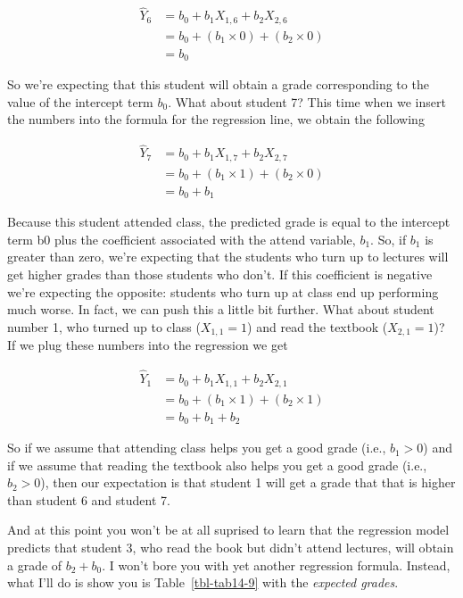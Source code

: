 \documentclass[
  a4paper,
]{book}
\begin{document}
\[
\begin{split}
\hat{Y}_6 & = b_0 + b_1 X_{1,6} + b_2 X_{2,6} \\
& = b_0 + (b_1 \times 0) + (b_2 \times 0) \\
& = b_0
\end{split}
\]

So we're expecting that this student will obtain a grade corresponding
to the value of the intercept term \(b_0\). What about student 7? This
time when we insert the numbers into the formula for the regression
line, we obtain the following

\[
\begin{split}
\hat{Y}_7 & = b_0 + b_1 X_{1,7} + b_2 X_{2,7} \\
& = b_0 + (b_1 \times 1) + (b_2 \times 0) \\
& = b_0 + b_1
\end{split}
\]

Because this student attended class, the predicted grade is equal to the
intercept term b0 plus the coefficient associated with the attend
variable, \(b_1\). So, if \(b_1\) is greater than zero, we're expecting
that the students who turn up to lectures will get higher grades than
those students who don't. If this coefficient is negative we're
expecting the opposite: students who turn up at class end up performing
much worse. In fact, we can push this a little bit further. What about
student number 1, who turned up to class (\(X_{1,1} = 1\)) and read the
textbook (\(X_{2,1} = 1\))? If we plug these numbers into the regression
we get

\[
\begin{split}
\hat{Y}_1 & = b_0 + b_1 X_{1,1} + b_2 X_{2,1} \\
& = b_0 + (b_1 \times 1) + (b_2 \times 1) \\
& = b_0 + b_1 + b_2
\end{split}
\]

So if we assume that attending class helps you get a good grade (i.e.,
\(b_1 > 0\)) and if we assume that reading the textbook also helps you
get a good grade (i.e., \(b_2 > 0\)), then our expectation is that
student 1 will get a grade that that is higher than student 6 and
student 7.

And at this point you won't be at all suprised to learn that the
regression model predicts that student 3, who read the book but didn't
attend lectures, will obtain a grade of \(b_{2} + b_{0}\). I won't bore
you with yet another regression formula. Instead, what I'll do is show
you is Table~\ref{tbl-tab14-9} with the \emph{expected grades}.
\end{document}
